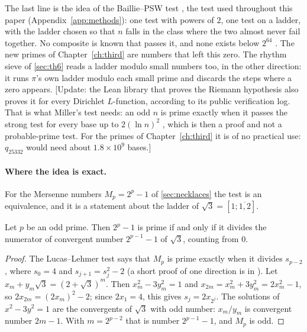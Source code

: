 The last line is the idea of the Baillie--PSW test \citep{BaillieWagstaff1980,PomeranceSelfridgeWagstaff1980}, the test used
throughout this paper (Appendix~\ref{app:methods}): one test with powers of $2$, one test on a ladder, with the ladder
chosen so that $n$ falls in the class where the two almost never fail together. No composite is known
that passes it, and none exists below $2^{64}$ \citep{WikiBPSW}. The new primes of Chapter~\ref{ch:third} are
numbers that left this zero. The rhythm sieve of \cref{sec:th6} reads a ladder modulo small numbers too,
in the other direction: it runs $\pi$'s own ladder modulo each small prime and discards the steps where
a zero appears. [Update: the Lean library that proves the Riemann hypothesis \citep{LeanRH2026} also proves it for every Dirichlet $L$-function, according to its public verification log. That is what Miller's test needs: an odd $n$ is prime exactly when it passes the strong test for every base up to $2(\ln n)^2$ \citep{Miller1976,Bach1990}, which is then a proof and not a probable-prime test. For the primes of Chapter~\ref{ch:third} it is of no practical use: $q_{25332}$ would need about $1.8\times10^9$ bases.] \addedon{\revH}

\paragraph{Where the idea is exact.} For the Mersenne numbers $M_p=2^{p}-1$ of \cref{sec:necklaces} the test is
an equivalence, and it is a statement about the ladder of $\sqrt3=[1;\overline{1,2}]$.

\begin{proposition}\label{prop:7ll}
Let $p$ be an odd prime. Then $2^{p}-1$ is prime if and only if it divides the numerator of convergent
number $2^{p-1}-1$ of $\sqrt3$, counting from $0$.
\end{proposition}

\begin{proof}
The Lucas--Lehmer test \citep[Theorem 2.2]{ConradLL} says that $M_p$ is prime exactly when it
divides $s_{p-2}$, where $s_0=4$ and $s_{j+1}=s_j^{2}-2$ (a short proof of one direction is in
\citep{Bruce1993}). Let $x_m+y_m\sqrt3=(2+\sqrt3)^{m}$. Then $x_m^{2}-3y_m^{2}=1$ and
$x_{2m}=x_m^{2}+3y_m^{2}=2x_m^{2}-1$, so $2x_{2m}=(2x_m)^{2}-2$; since $2x_1=4$, this gives
$s_j=2x_{2^{j}}$. The solutions of $x^{2}-3y^{2}=1$ are the convergents of $\sqrt3$ with odd number:
$x_m/y_m$ is convergent number $2m-1$. With $m=2^{p-2}$ that is number $2^{p-1}-1$, and $M_p$ is odd.
\end{proof}

